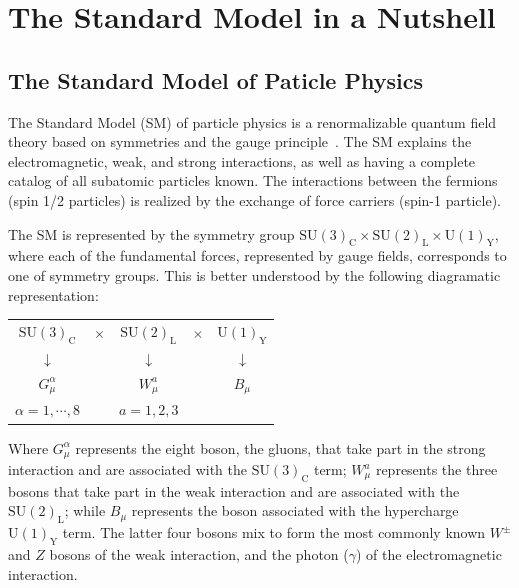 \chapter{The Standard Model in a Nutshell}
\section{The Standard Model of Paticle Physics}
The Standard Model (SM) of particle physics is a renormalizable
quantum field theory based on symmetries and the gauge principle~\cite{HOOF,WeinbergLeptons}. The
SM explains the electromagnetic, weak, and strong interactions, as
well as having a complete catalog of all subatomic particles
known. The interactions between the fermions (spin 1/2 particles) is
realized by the exchange of force carriers (spin-1 particle).

The SM is represented by the symmetry group $\mathrm{SU(3)_{C}} \times
\mathrm{SU(2)_{L}} \times \mathrm{U(1)_{Y}}$, where each of the
fundamental forces, represented by gauge fields, corresponds to one of
symmetry groups. This is better understood by the following
diagramatic representation:

\begin{center}
\begin{tabular}{ c c c c c }
  $\mathrm{SU(3)_{C}}$ & $\times$ & $\mathrm{SU(2)_{L}}$ & $\times$ & $\mathrm{U(1)_{Y}}$\\
  $\downarrow$ &  & $\downarrow$ & & $\downarrow$\\
  $G^{\alpha}_{\mu}$ &  & $W^{a}_{\mu}$& &$B_{\mu}$ \\
  $\alpha = 1,\cdots,8$ & & $a = 1,2,3$ & & \\
\end{tabular}
\end{center}

Where $G^{\alpha}_{\mu}$ represents the eight boson, the gluons, that take part in
the strong interaction and are associated with the
$\mathrm{SU(3)_{C}}$ term;  $W^{a}_{\mu}$ represents the three bosons
that take part in the weak interaction and are associated with the
$\mathrm{SU(2)_{L}}$; while $B_{\mu}$ represents the boson associated
with the hypercharge $\mathrm{U(1)_{Y}}$ term. The latter four bosons
mix to form the most commonly known $W^{\pm}$ and $Z$ bosons of the
weak interaction, and the photon ($\gamma$) of the electromagnetic
interaction.

